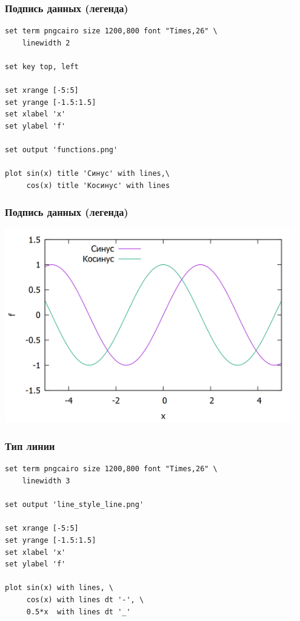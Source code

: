 \documentclass[12pt, compress]{beamer}
\begin{document}
\begin{frame}[c,fragile]
\frametitle{Подпись данных (легенда)}
\begin{lstlisting}
set term pngcairo size 1200,800 font "Times,26" \
    linewidth 2

set key top, left

set xrange [-5:5]
set yrange [-1.5:1.5]
set xlabel 'x'
set ylabel 'f'

set output 'functions.png'

plot sin(x) title 'Синус' with lines,\
     cos(x) title 'Косинус' with lines
\end{lstlisting}
\end{frame}

\begin{frame}[c,fragile]
\frametitle{Подпись данных (легенда)}
\includegraphics[width=0.95\textwidth]{./gp/functions3.png}
\end{frame}

\begin{frame}[c,fragile]
\frametitle{Тип линии}
\begin{lstlisting}
set term pngcairo size 1200,800 font "Times,26" \
    linewidth 3

set output 'line_style_line.png' 

set xrange [-5:5]
set yrange [-1.5:1.5]
set xlabel 'x'
set ylabel 'f'

plot sin(x) with lines, \
     cos(x) with lines dt '-', \
     0.5*x  with lines dt '_'
\end{lstlisting}
\end{frame}
\end{document}
